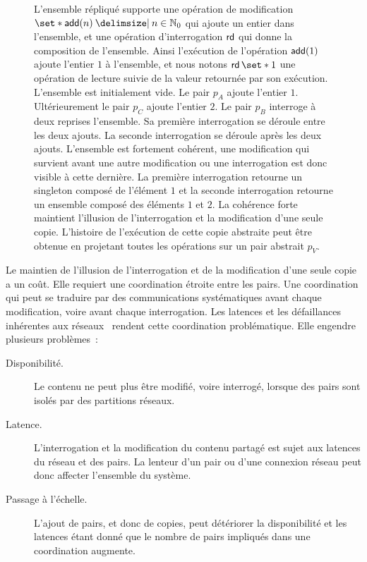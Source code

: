 \begin{figure}[htb]
{L'ensemble répliqué supporte une opération de modification $\set*{\trm{add}(n) \given n \in \mathbb{N}_0}$ qui ajoute un entier dans l'ensemble, et une opération d'interrogation $\operatorname{\mathsf{rd}}$ qui donne la composition de l'ensemble.
Ainsi l'exécution de l'opération $\operatorname{\mathsf{add}}(1)$ ajoute l'entier $1$ à l'ensemble, et nous notons $\trm{rd} \set*{1}$ une opération de lecture suivie de la valeur retournée par son exécution.
L'ensemble est initialement vide.
Le pair $p_A$ ajoute l'entier $1$.
Ultérieurement le pair $p_C$ ajoute l'entier $2$.
Le pair $p_B$ interroge à deux reprises l'ensemble.
Sa première interrogation se déroule entre les deux ajouts.
La seconde interrogation se déroule après les deux ajouts.
L'ensemble est fortement cohérent, une modification qui survient avant une autre modification ou une interrogation est donc visible à cette dernière.
La première interrogation retourne un singleton composé de l'élément $1$ et la seconde interrogation retourne un ensemble composé des éléments $1$ et $2$.
La cohérence forte maintient l'illusion de l'interrogation et la modification d'une seule copie.
 L'histoire de l'exécution de cette copie abstraite peut être obtenue en projetant toutes les opérations sur un pair abstrait $p_V$.
}\label{fig:strong-consistency}
\end{figure}

Le maintien de l'illusion de l'interrogation et de la modification d'une seule copie a un coût.
Elle requiert une coordination étroite entre les pairs.
Une coordination qui peut se traduire par des communications systématiques avant chaque modification, voire avant chaque interrogation.
Les latences et les défaillances inhérentes aux réseaux~\cite{rotem_falalcies_2006} rendent cette coordination problématique.
Elle engendre plusieurs problèmes~:

\begin{description}
    \item[Disponibilité.] Le contenu ne peut plus être modifié, voire interrogé, lorsque des pairs sont isolés par des partitions réseaux.
    \item[Latence.] L'interrogation et la modification du contenu partagé est sujet aux latences du réseau et des pairs.
    La lenteur d'un pair ou d'une connexion réseau peut donc affecter l'ensemble du système.
    \item[Passage à l'échelle.] L'ajout de pairs, et donc de copies, peut détériorer la disponibilité et les latences étant donné que le nombre de pairs impliqués dans une coordination augmente.
\end{description}

